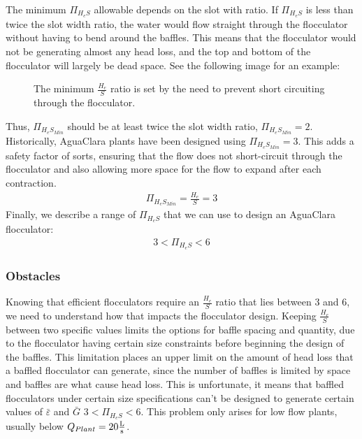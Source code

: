 \documentclass[letterpaper,10pt,english]{sphinxmanual}
\let\sphinxpxdimen\pdfpxdimen\else\newdimen\sphinxpxdimen
\begin{document}
The minimum \(\Pi_{H_eS}\) allowable depends on the slot with ratio. If \(\Pi_{H_eS}\) is less than twice the slot width ratio, the water would flow straight through the flocculator without having to bend around the baffles. This means that the flocculator would not be generating almost any head loss, and the top and bottom of the flocculator will largely be dead space. See the following image for an example:

\begin{figure}[htbp]
\centering
\capstart

\noindent\sphinxincludegraphics[width=600\sphinxpxdimen]{{HeS_ratio_min}.jpg}
\caption{The minimum \(\frac{H_e}{S}\) ratio is set by the need to prevent short circuiting through the flocculator.}\label{\detokenize{Flocculation/Floc_Design:id13}}\label{\detokenize{Flocculation/Floc_Design:figure-hes-ratio-min}}\end{figure}

Thus, \(\Pi_{H_eS_{Min}}\) should be at least twice the slot width ratio, \(\Pi_{H_eS_{Min}} = 2\). Historically, AguaClara plants have been designed using \(\Pi_{H_eS_{Min}} = 3\). This adds a safety factor of sorts, ensuring that the flow does not short-circuit through the flocculator and also allowing more space for the flow to expand after each contraction.
\begin{equation}\label{equation:Flocculation/Floc_Design:Flocculation/Floc_Design:13}
\begin{split}\Pi_{H_eS_{Min}} = \frac{H_e}{S} = 3\end{split}
\end{equation}
Finally, we describe a range of \(\Pi_{H_eS}\) that we can use to design an AguaClara flocculator:
\begin{equation}\label{equation:Flocculation/Floc_Design:Flocculation/Floc_Design:14}
\begin{split}3 < \Pi_{H_eS} < 6\end{split}
\end{equation}

\subsubsection{Obstacles}
\label{\detokenize{Flocculation/Floc_Design:obstacles}}
Knowing that efficient flocculators require an \(\frac{H_e}{S}\) ratio that lies between 3 and 6, we need to understand how that impacts the flocculator design. Keeping \(\frac{H_e}{S}\) between two specific values limits the options for baffle spacing and quantity, due to the flocculator having certain size constraints before beginning the design of the baffles. This limitation places an upper limit on the amount of head loss that a baffled flocculator can generate, since the number of baffles is limited by space and baffles are what cause head loss. This is unfortunate, it means that baffled flocculators under certain size specifications can’t be designed to generate certain values of \(\bar \varepsilon\) and \(\bar G\)  \(3 < \Pi_{H_eS} < 6\). This problem only arises for low flow plants, usually below \(Q_{Plant} = 20 {\rm \frac{L}{s}}\).
\end{document}
